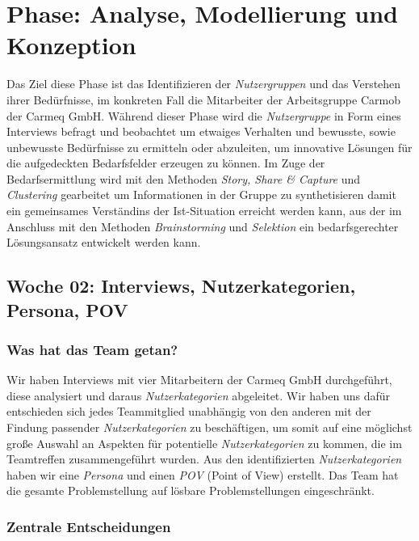 \documentclass{article}
\begin{document}
\section{Phase: Analyse, Modellierung und Konzeption}

Das Ziel diese Phase ist das Identifizieren der \textit{Nutzergruppen} und das Verstehen ihrer Bed\"urfnisse, im konkreten Fall die Mitarbeiter der Arbeitsgruppe Carmob der Carmeq GmbH. W\"ahrend dieser Phase wird die \textit{Nutzergruppe} in Form eines Interviews befragt und beobachtet um etwaiges Verhalten und bewusste, sowie unbewusste Bed\"urfnisse zu ermitteln oder abzuleiten, um innovative L\"osungen f\"ur die aufgedeckten Bedarfsfelder erzeugen zu k\"onnen. Im Zuge der Bedarfsermittlung wird mit den Methoden \textit{Story, Share \& Capture} und \textit{Clustering} gearbeitet um Informationen in der Gruppe zu synthetisieren damit ein gemeinsames Verst\"andins der Ist-Situation erreicht werden kann, aus der im Anschluss mit den Methoden \textit{Brainstorming} und \textit{Selektion} ein bedarfsgerechter L\"osungsansatz entwickelt werden kann. 

\subsection{Woche 02: Interviews, Nutzerkategorien, Persona, POV}

\subsubsection{Was hat das Team getan?}

Wir haben Interviews mit vier Mitarbeitern der Carmeq GmbH durchgef\"uhrt, diese analysiert und daraus \textit{Nutzerkategorien} abgeleitet. Wir haben uns daf\"ur entschieden sich jedes Teammitglied unabh\"angig von den anderen mit der Findung passender \textit{Nutzerkategorien} zu besch\"aftigen, um somit auf eine m\"oglichst gro\ss e Auswahl an Aspekten f\"ur potentielle \textit{Nutzerkategorien} zu kommen, die im Teamtreffen zusammengef\"uhrt wurden. Aus den identifizierten \textit{Nutzerkategorien} haben wir eine \textit{Persona} und einen \textit{POV} (Point of View) erstellt. Das Team hat die gesamte Problemstellung auf l\"osbare Problemstellungen eingeschr\"ankt.

\subsubsection{Zentrale Entscheidungen}
\end{document}
